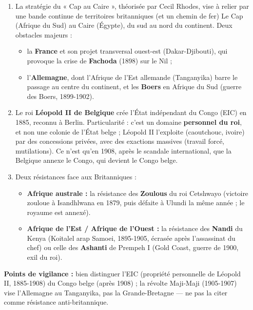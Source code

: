 \documentclass[11pt]{article}
\begin{document}
\begin{corrige}
\begin{enumerate}
    \item La stratégie du « Cap au Caire », théorisée par Cecil Rhodes, vise à relier par une bande continue de territoires britanniques (et un chemin de fer) Le Cap (Afrique du Sud) au Caire (Égypte), du sud au nord du continent. Deux obstacles majeurs :
    \begin{itemize}
        \item la \textbf{France} et son projet transversal ouest-est (Dakar-Djibouti), qui provoque la crise de \textbf{Fachoda} (1898) sur le Nil ;
        \item l'\textbf{Allemagne}, dont l'Afrique de l'Est allemande (Tanganyika) barre le passage au centre du continent, et les \textbf{Boers} en Afrique du Sud (guerre des Boers, 1899-1902).
    \end{itemize}
    \item Le roi \textbf{Léopold II de Belgique} crée l'État indépendant du Congo (EIC) en 1885, reconnu à Berlin. Particularité : c'est un domaine \textbf{personnel du roi}, et non une colonie de l'État belge ; Léopold II l'exploite (caoutchouc, ivoire) par des concessions privées, avec des exactions massives (travail forcé, mutilations). Ce n'est qu'en 1908, après le scandale international, que la Belgique annexe le Congo, qui devient le Congo belge.
    \item Deux résistances face aux Britanniques :
    \begin{itemize}
        \item \textbf{Afrique australe :} la résistance des \textbf{Zoulous} du roi Cetshwayo (victoire zouloue à Isandhlwana en 1879, puis défaite à Ulundi la même année ; le royaume est annexé).
        \item \textbf{Afrique de l'Est / Afrique de l'Ouest :} la résistance des \textbf{Nandi} du Kenya (Koitalel arap Samoei, 1895-1905, écrasée après l'assassinat du chef) ou celle des \textbf{Ashanti} de Prempeh I (Gold Coast, guerre de 1900, exil du roi).
    \end{itemize}
\end{enumerate}
\textbf{Points de vigilance :} bien distinguer l'EIC (propriété personnelle de Léopold II, 1885-1908) du Congo belge (après 1908) ; la révolte Maji-Maji (1905-1907) vise l'Allemagne au Tanganyika, pas la Grande-Bretagne — ne pas la citer comme résistance anti-britannique.
\end{corrige}
\end{document}
